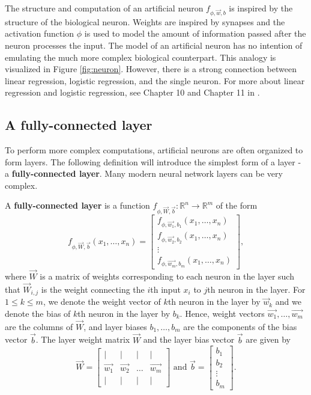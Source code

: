 The structure and computation of an artificial neuron $f_{\phi, \vec{w}, b}$ is inspired by the structure of the biological neuron. Weights are inspired by synapses and the activation function $\phi$ is used to model the amount of information passed after the neuron processes the input. The model of an artificial neuron has no intention of emulating the much more complex biological counterpart. This analogy is visualized in Figure \ref{fig:neuron}. However, there is a strong connection between linear regression, logistic regression, and the single neuron. For more about linear regression and logistic regression, see Chapter 10 and Chapter 11 in \cite{pmlbook}.

\subsection{A fully-connected layer}
To perform more complex computations, artificial neurons are often organized to form layers. The following definition will introduce the simplest form of a layer - a \textbf{fully-connected layer}. Many modern neural network layers can be very complex.
\begin{definition}
\label{defn:layer}
A \textbf{fully-connected layer} is a function $f_{\phi, \vec{W}, \vec{b}} : \mathbb{R}^n \to \mathbb{R}^m$ of the form
\begin{equation*}
    f_{\phi, \vec{W}, \vec{b}} (x_1, \ldots, x_n) = \begin{bmatrix}
           f_{\phi, \vec{w_1}, b_1} (x_1, \ldots, x_n)  \\
           f_{\phi, \vec{w_2}, b_2} (x_1, \ldots, x_n) \\
           \vdots \\
           f_{\phi, \vec{w_m}, b_m} (x_1, \ldots, x_n)
         \end{bmatrix},
\end{equation*} where $\vec{W}$ is a matrix of weights corresponding to each neuron in the layer such that $\vec{W}_{i, j}$ is the weight connecting the $i$th input $x_i$ to $j$th neuron in the layer. For $1 \leq k \leq m$, we denote the weight vector of $k$th neuron in the layer by $\vec{w}_k$ and we denote the bias of $k$th neuron in the layer by $b_k$. Hence, weight vectors $\vec{w_1}, \ldots, \vec{w_m}$ are the columns of $\vec{W}$, and layer biases $b_1, \ldots, b_m$ are the components of the bias vector $\vec{b}$. The layer weight matrix $\vec{W}$ and the layer bias vector $\vec{b}$ are given by
\begin{equation*}
    \vec{W} = \begin{bmatrix}
    \vert & \vert  & \vert  & \vert \\
    \vec{w_1}   & \vec{w_2}  & \ldots  & \vec{w_m}   \\
    \vert & \vert & \vert  & \vert
    \end{bmatrix} \text{ and }
    \vec{b} = \begin{bmatrix}
       b_{1}  \\
       b_{2}  \\
       \vdots \\
       b_{m}
    \end{bmatrix}.
\end{equation*}
\end{definition}
